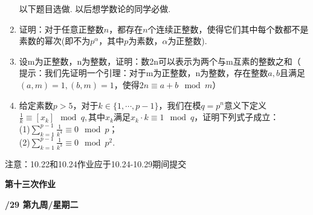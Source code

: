 \documentclass[a4paper,12pt]{article}
\begin{document}
\begin{enumerate}
{\color{red} 以下题目选做. 以后想学数论的同学必做.}
 
 \item 证明：对于任意正整数$n$，都存在$n$个连续正整数，使得它们其中每个数都不是素数的幂次(即不为$p^{\alpha}$，其中$p$为素数，$\alpha$为正整数).
 \item 设m为正整数，n为整数，证明：数2n可以表示为两个与m互素的整数之和（{\color{blue} 提示：我们先证明一个引理：对于m为正整数，n为整数，存在整数$a,b$且满足$(a,m)=1,(b,m)=1$，使得$2n\equiv a+b \mod m$}）

\item 给定素数$p>5$，对于$k\in\{1,\cdots,p-1\}$，我们在模$q=p^n$意义下定义$\frac{1}{k}\equiv [x_k] \mod q,\text{其中}x_k\text{满足}x_k\cdot k \equiv 1 \mod q$，证明下列式子成立：\\
    (1)\quad$\sum \limits_{k=1}^{p-1} \frac{1}{k^4} \equiv 0 \mod p$；\\
    (2)\quad$\sum \limits_{k=1}^{p-1} \frac{1}{k^3} \equiv 0 \mod p^2$.
\end{enumerate}

{\color{red} 注意：10.22和10.24作业应于10.24-10.29期间提交}


\newpage
\head

\begin{center} %
	{\Large \bf 第十三次作业} %
	\vspace{2mm}
	
	{\bf{}/29 \quad  第九周/星期二} %
\end{center} 
\end{document}
